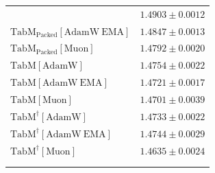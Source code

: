 \begin{longtable}{p{}p{}}
{\begin{tabular}{ll}
{\footnotesize $\mathrm{TabM_{\text{Packed}}[AdamW]}$ } & {\footnotesize$1.4903 \pm 0.0012$}\\ 
{\footnotesize $\mathrm{TabM_{\text{Packed}}[AdamW\ EMA]}$ } & {\footnotesize$1.4847 \pm 0.0013$}\\ 
{\footnotesize $\mathrm{TabM_{\text{Packed}}[Muon]}$ } & {\footnotesize$1.4792 \pm 0.0020$}\\ 
{\footnotesize $\mathrm{TabM[AdamW]}$ } & {\footnotesize$1.4754 \pm 0.0022$}\\ 
{\footnotesize $\mathrm{TabM[AdamW\ EMA]}$ } & {\footnotesize$1.4721 \pm 0.0017$}\\ 
{\footnotesize $\mathrm{TabM[Muon]}$ } & {\footnotesize$1.4701 \pm 0.0039$}\\ 
{\footnotesize $\mathrm{TabM^\dagger[AdamW]}$ } & {\footnotesize$1.4733 \pm 0.0022$}\\ 
{\footnotesize $\mathrm{TabM^\dagger[AdamW\ EMA]}$ } & {\footnotesize$1.4744 \pm 0.0029$}\\ 
{\footnotesize $\mathrm{TabM^\dagger[Muon]}$ } & {\footnotesize$1.4635 \pm 0.0024$}\\ 
\bottomrule
\end{tabular}}

\\
\topalign{
\centering
\setlength\tabcolsep{2.5pt}
\renewcommand{\arraystretch}{0.8}
\begin{tabular}{ll}


\end{tabular}}
\end{longtable}
